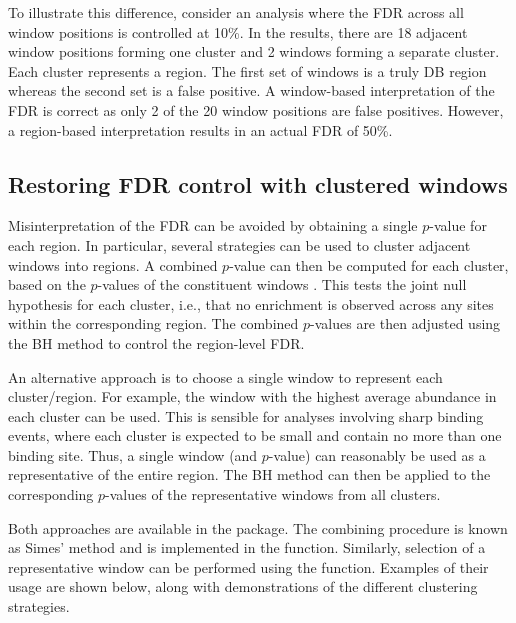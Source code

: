 \documentclass{report}\usepackage[]{graphicx}\usepackage[usenames,dvipsnames]{color}
\begin{document}
To illustrate this difference, consider an analysis where the FDR across all window positions is controlled at 10\%. 
In the results, there are 18 adjacent window positions forming one cluster and 2 windows forming a separate cluster.
Each cluster represents a region. 
The first set of windows is a truly DB region whereas the second set is a false positive. 
A window-based interpretation of the FDR is correct as only 2 of the 20 window positions are false positives.
However, a region-based interpretation results in an actual FDR of 50\%.


\subsection{Restoring FDR control with clustered windows}
Misinterpretation of the FDR can be avoided by obtaining a single $p$-value for each region.
In particular, several strategies can be used to cluster adjacent windows into regions.
A combined $p$-value can then be computed for each cluster, based on the $p$-values of the constituent windows \cite{simes1986}.
This tests the joint null hypothesis for each cluster, i.e., that no enrichment is observed across any sites within the corresponding region. 
The combined $p$-values are then adjusted using the BH method to control the region-level FDR.

An alternative approach is to choose a single window to represent each cluster/region.
For example, the window with the highest average abundance in each cluster can be used.
This is sensible for analyses involving sharp binding events, where each cluster is expected to be small and contain no more than one binding site.
Thus, a single window (and $p$-value) can reasonably be used as a representative of the entire region.
The BH method can then be applied to the corresponding $p$-values of the representative windows from all clusters.

Both approaches are available in the  package.
The combining procedure is known as Simes' method and is implemented in the  function.
Similarly, selection of a representative window can be performed using the  function.
Examples of their usage are shown below, along with demonstrations of the different clustering strategies.
\end{document}
